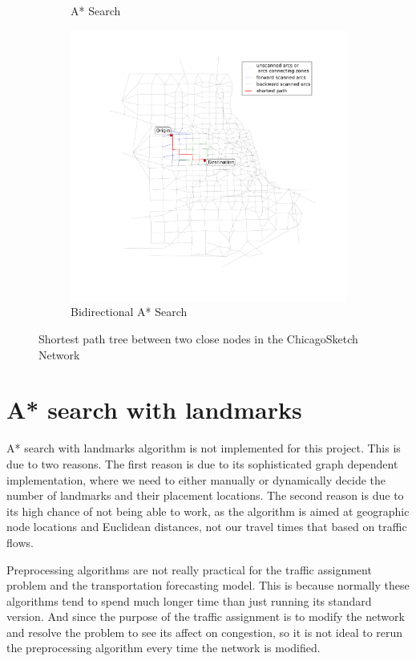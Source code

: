\begin{figure}
\begin{subfigure}{.5\textwidth}
        \caption{A* Search}
        \label{fig:chicago_astar2}
    \end{subfigure}%
    \begin{subfigure}{.5\textwidth}
        \centering
        \includegraphics[width=\textwidth,trim=120px 120px 48px 0px,clip]{img/chicago_astar_bidirect2}
        \caption{Bidirectional A* Search}
        \label{fig:chicago_astar_bidirect2}
    \end{subfigure}
    \vspace{1em}
    \caption{Shortest path tree between two close nodes in the ChicagoSketch Network}
    \label{fig:short_sptree}
\end{figure}

\section{A* search with landmarks}
A* search with landmarks algorithm is not implemented for this project.
This is due to two reasons.
The first reason is due to its sophisticated graph dependent implementation,
where we need to either manually or dynamically decide the number of landmarks and their placement locations.
The second reason is due to its high chance of not being able to work,
as the algorithm is aimed at geographic node locations and Euclidean distances,
not our travel times that based on traffic flows.

Preprocessing algorithms are not really practical for the traffic assignment problem and the transportation forecasting model.
This is because normally these algorithms tend to spend much longer time than just running its standard version.
And since the purpose of the traffic assignment is to modify the network and resolve the problem to see its affect on congestion,
so it is not ideal to rerun the preprocessing algorithm every time the network is modified.
